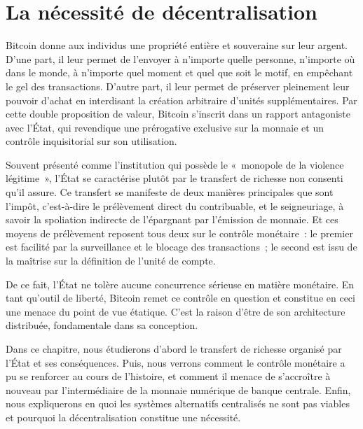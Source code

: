 
\chapter{La nécessité de décentralisation}
\label{ch:adversaire} \label{enotezch:4}

Bitcoin donne aux individus une propriété entière et souveraine sur leur argent. D'une part, il leur permet de l'envoyer à n'importe quelle personne, n'importe où dans le monde, à n'importe quel moment et quel que soit le motif, en empêchant le gel des transactions. D'autre part, il leur permet de préserver pleinement leur pouvoir d'achat en interdisant la création arbitraire d'unités supplémentaires. Par cette double proposition de valeur, Bitcoin s'inscrit dans un rapport antagoniste avec l'État, qui revendique une prérogative exclusive sur la monnaie et un contrôle inquisitorial sur son utilisation.

Souvent présenté comme l'institution qui possède le «~monopole de la violence légitime~», l'État se caractérise plutôt par le transfert de richesse non consenti qu'il assure. Ce transfert se manifeste de deux manières principales que sont l'impôt, c'est-à-dire le prélèvement direct du contribuable, et le seigneuriage, à savoir la spoliation indirecte de l'épargnant par l'émission de monnaie. Et ces moyens de prélèvement reposent tous deux sur le contrôle monétaire~: le premier est facilité par la surveillance et le blocage des transactions~; le second est issu de la maîtrise sur la définition de l'unité de compte.

De ce fait, l'État ne tolère aucune concurrence sérieuse en matière monétaire. En tant qu'outil de liberté, Bitcoin remet ce contrôle en question et constitue en ceci une menace du point de vue étatique. C'est la raison d'être de son architecture distribuée, fondamentale dans sa conception.

Dans ce chapitre, nous étudierons d'abord le transfert de richesse organisé par l'État et ses conséquences. Puis, nous verrons comment le contrôle monétaire a pu se renforcer au cours de l'histoire, et comment il menace de s'accroître à nouveau par l'intermédiaire de la monnaie numérique de banque centrale. Enfin, nous expliquerons en quoi les systèmes alternatifs centralisés ne sont pas viables et pourquoi la décentralisation constitue une nécessité.

